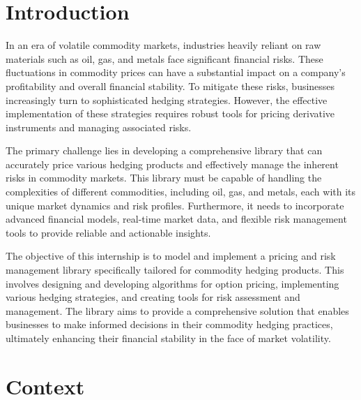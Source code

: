 \documentclass[12pt]{article}
\begin{document}
\section{Introduction}
In an era of volatile commodity markets, industries heavily reliant on raw materials such as oil, gas, and metals face significant financial risks. These fluctuations in commodity prices can have a substantial impact on a company's profitability and overall financial stability. To mitigate these risks, businesses increasingly turn to sophisticated hedging strategies. However, the effective implementation of these strategies requires robust tools for pricing derivative instruments and managing associated risks.\\\par
The primary challenge lies in developing a comprehensive library that can accurately price various hedging products and effectively manage the inherent risks in commodity markets. This library must be capable of handling the complexities of different commodities, including oil, gas, and metals, each with its unique market dynamics and risk profiles. Furthermore, it needs to incorporate advanced financial models, real-time market data, and flexible risk management tools to provide reliable and actionable insights.\\\par
The objective of this internship is to model and implement a pricing and risk management library specifically tailored for commodity hedging products. This involves designing and developing algorithms for option pricing, implementing various hedging strategies, and creating tools for risk assessment and management. The library aims to provide a comprehensive solution that enables businesses to make informed decisions in their commodity hedging practices, ultimately enhancing their financial stability in the face of market volatility.

\section{Context}
\end{document}
